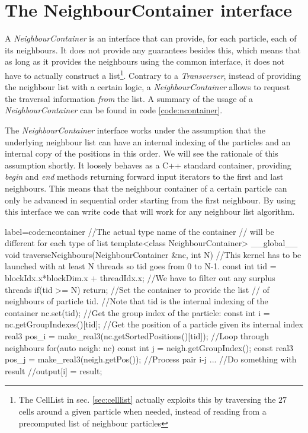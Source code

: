 \documentclass[twoside,openright,titlepage,numbers=noenddot,%
headinclude,footinclude,cleardoublepage=empty,abstract=on,
BCOR=5mm,fontsize=11pt, dvipsnames, paper=b5
]{scrreprt}
\begin{document}
\section{The NeighbourContainer interface}\label{sec:ncontainer}
A \emph{NeighbourContainer} is an interface that can provide, for each particle, each of its neighbours. It does not provide any guarantees besides this, which means that as long as it provides the neighbours using the common interface, it does not have to actually construct a list\footnote{The CellList in sec. \ref{sec:celllist} actually exploits this by traversing the $27$ cells around a given particle when needed, instead of reading from a precomputed list of neighbour particles}. Contrary to a \emph{Transverser}, instead of providing the neighbour list with a certain logic, a \emph{NeighbourContainer} allows to request the traversal information \emph{from} the list. A summary of the usage of a \emph{NeighbourContainer} can be found in code \ref{code:ncontainer}.

The \emph{NeighbourContainer} interface works under the assumption that the underlying neighbour list can have an internal indexing of the particles and an internal copy of the positions in this order. We will see the rationale of this assumption shortly.
It loosely behaves as a C++ standard container, providing \emph{begin} and \emph{end} methods returning forward input iterators to the first and last neighbours. This means that the neighbour container of a certain particle can only be advanced in sequential order starting from the first neighbour.
By using this interface we can write code that will work for any neighbour list algorithm.

\begin{code2}
{label=code:ncontainer}
//The actual type name of the container
//  will be different for each type of list
template<class NeighbourContainer>
__global__ void traverseNeighbours(NeighbourContainer &nc, int N){
  //This kernel has to be launched with at least N threads so tid goes from 0 to N-1.
  const int tid = blockIdx.x*blockDim.x + threadIdx.x;
  //We have to filter out any surplus threads
  if(tid >= N) return;                                   
  //Set the container to provide the list 
  // of neighbours of particle tid.
  //Note that tid is the internal indexing of the container
  nc.set(tid);
  //Get the group index of the particle:
  const int i = nc.getGroupIndexes()[tid];
  //Get the position of a particle given its internal index
  real3 pos_i = make_real3(nc.getSortedPositions()[tid]);
  //Loop through neighbours
  for(auto neigh: nc){
    const int j = neigh.getGroupIndex();
    const real3 pos_j = make_real3(neigh.getPos());
    //Process pair i-j
    ...
  }
  //Do something with result
  //output[i] = result;
  }
\end{code2}
\end{document}
